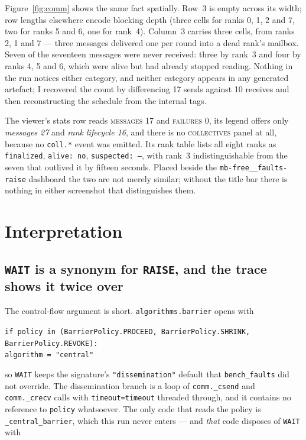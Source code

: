 \documentclass[11pt]{article}
\begin{document}
Figure~\ref{fig:comm} shows the same fact spatially. Row~3 is empty across its width; row
lengths elsewhere encode blocking depth (three cells for ranks 0, 1, 2 and 7, two for
ranks 5 and 6, one for rank~4). Column~3 carries three cells, from ranks 2, 1 and 7 ---
three messages delivered one per round into a dead rank's mailbox. Seven of the seventeen
messages were never received: three by rank~3 and four by ranks 4, 5 and 6, which were
alive but had already stopped reading. Nothing in the run notices either category, and
neither category appears in any generated artefact; I recovered the count by differencing
17 sends against 10 receives and then reconstructing the schedule from the internal tags.

The viewer's stats row reads \textsc{messages 17} and \textsc{failures 0}, its legend
offers only \emph{messages 27} and \emph{rank lifecycle 16}, and there is no
\textsc{collectives} panel at all, because no \texttt{coll.*} event was emitted. Its rank
table lists all eight ranks as \texttt{finalized}, \texttt{alive: no},
\texttt{suspected: --}, with rank~3 indistinguishable from the seven that outlived it by
fifteen seconds. Placed beside the \texttt{mb-free\_\_faults-raise} dashboard the two are
not merely similar; without the title bar there is nothing in either screenshot that
distinguishes them.

\section{Interpretation}

\subsection{\texttt{WAIT} is a synonym for \texttt{RAISE}, and the trace shows it twice over}

The control-flow argument is short. \texttt{algorithms.barrier} opens with

\begin{center}
\texttt{if policy in (BarrierPolicy.PROCEED, BarrierPolicy.SHRINK, BarrierPolicy.REVOKE):}\\
\texttt{\hspace*{2em}algorithm = "central"}
\end{center}

\noindent so \texttt{WAIT} keeps the signature's \texttt{"dissemination"} default that
\texttt{bench\_faults} did not override. The dissemination branch is a loop of
\texttt{comm.\_csend} and \texttt{comm.\_crecv} calls with \texttt{timeout=timeout}
threaded through, and it contains no reference to \texttt{policy} whatsoever. The only
code that reads the policy is \texttt{\_central\_barrier}, which this run never enters ---
and \emph{that} code disposes of \texttt{WAIT} with
\end{document}
